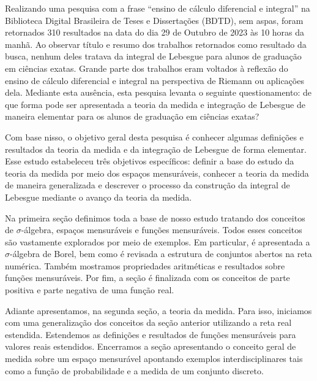     Realizando uma pesquisa com a frase \enquote{ensino de cálculo diferencial e integral} na Biblioteca Digital Brasileira de Teses e Dissertações (BDTD), sem
    aspas, foram retornados 310 resultados na data do dia 29 de Outubro de 2023 às 10 horas da manhã.
    Ao observar título e resumo dos trabalhos retornados como resultado da busca, nenhum deles tratava da integral de Lebesgue para alunos de graduação em ciências exatas.
    Grande parte dos trabalhos eram voltados à reflexão do ensino de cálculo diferencial e integral na perspectiva de Riemann ou aplicações dela.
    Mediante esta ausência, esta pesquisa levanta o seguinte questionamento: de que forma pode ser apresentada a teoria da medida e integração de Lebesgue de maneira elementar para os alunos de graduação em ciências exatas?
    
    Com base nisso, o objetivo geral desta pesquisa é conhecer algumas definições e resultados da teoria da medida e da integração de Lebesgue de forma elementar.
    Esse estudo estabeleceu três objetivos específicos: 
    definir a base do estudo da teoria da medida por meio dos espaços mensuráveis,
    conhecer a teoria da medida de maneira generalizada e descrever o processo da construção da integral de Lebesgue mediante o avanço da teoria da medida.
    
  	
  	Na primeira seção definimos toda a base de nosso estudo tratando dos conceitos de $\sigma$-álgebra, espaços mensuráveis e funções mensuráveis.
  	Todos esses conceitos são vastamente explorados por meio de exemplos.
  	Em particular, é apresentada a $\sigma$-álgebra de Borel, bem como é revisada a estrutura de conjuntos abertos na reta numérica.
  	Também mostramos propriedades aritméticas e resultados sobre funções mensuráveis.
  	Por fim, a seção é finalizada com os conceitos de parte positiva e parte negativa de uma função real.
  	
  	Adiante apresentamos, na segunda seção, a teoria da medida. 
  	Para isso, iniciamos com uma generalização dos conceitos da seção anterior utilizando a reta real estendida.
  	Estendemos as definições e resultados de funções mensuráveis para valores reais estendidos.
  	Encerramos a seção apresentando o conceito geral de medida sobre um espaço mensurável apontando exemplos interdisciplinares tais como a função de probabilidade e a medida de um conjunto discreto.
  	
